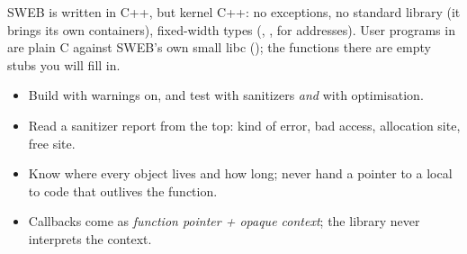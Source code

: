 \begin{swebbox}
SWEB is written in C++, but kernel C++: no exceptions, no standard
library (it brings its own  containers), fixed-width types
(, ,  for addresses). User
programs in  are plain C against SWEB's own small
libc (); the  functions there are
empty stubs you will fill in.
\end{swebbox}

\begin{keybox}
\begin{itemize}
  \item Build with warnings on, and test with sanitizers \emph{and} with
    optimisation.
  \item Read a sanitizer report from the top: kind of error, bad access,
    allocation site, free site.
  \item Know where every object lives and how long; never hand a pointer
    to a local to code that outlives the function.
  \item Callbacks come as \emph{function pointer + opaque context}; the
    library never interprets the context.
\end{itemize}
\end{keybox}
